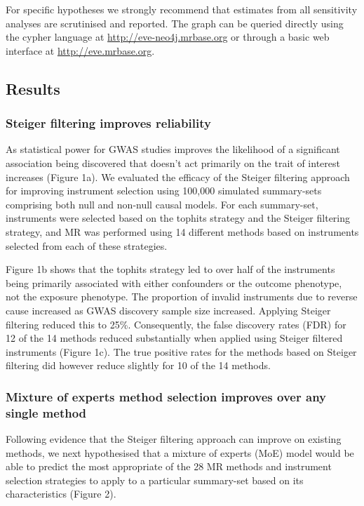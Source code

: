 \documentclass[]{article}
\begin{document}
For specific hypotheses we strongly recommend that estimates from all
sensitivity analyses are scrutinised and reported. The graph can be
queried directly using the cypher language at
\url{http://eve-neo4j.mrbase.org} or through a basic web interface at
\url{http://eve.mrbase.org}.

\subsection{Results}\label{results}

\subsubsection{Steiger filtering improves
reliability}\label{steiger-filtering-improves-reliability}

As statistical power for GWAS studies improves the likelihood of a
significant association being discovered that doesn't act primarily on
the trait of interest increases (Figure 1a). We evaluated the efficacy
of the Steiger filtering approach for improving instrument selection
using 100,000 simulated summary-sets comprising both null and non-null
causal models. For each summary-set, instruments were selected based on
the tophits strategy and the Steiger filtering strategy, and MR was
performed using 14 different methods based on instruments selected from
each of these strategies.

Figure 1b shows that the tophits strategy led to over half of the
instruments being primarily associated with either confounders or the
outcome phenotype, not the exposure phenotype. The proportion of invalid
instruments due to reverse cause increased as GWAS discovery sample size
increased. Applying Steiger filtering reduced this to 25\%.
Consequently, the false discovery rates (FDR) for 12 of the 14 methods
reduced substantially when applied using Steiger filtered instruments
(Figure 1c). The true positive rates for the methods based on Steiger
filtering did however reduce slightly for 10 of the 14 methods.

\subsubsection{Mixture of experts method selection improves over any
single
method}\label{mixture-of-experts-method-selection-improves-over-any-single-method}

Following evidence that the Steiger filtering approach can improve on
existing methods, we next hypothesised that a mixture of experts (MoE)
model would be able to predict the most appropriate of the 28 MR methods
and instrument selection strategies to apply to a particular summary-set
based on its characteristics (Figure 2).
\end{document}
